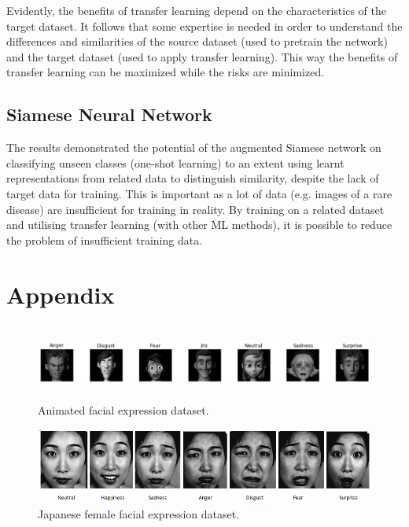 \documentclass{article}
\begin{document}
Evidently, the benefits of transfer learning depend on the characteristics of the target dataset. It follows that some expertise is needed in order to understand the differences and similarities of the source dataset (used to pretrain the network) and the target dataset (used to apply transfer learning). This way the benefits of transfer learning can be maximized while the risks are minimized.

\subsection{Siamese Neural Network}

The results demonstrated the potential of the augmented Siamese network on classifying unseen classes (one-shot learning) to an extent using learnt representations from related data to distinguish similarity, despite the lack of target data for training. This is important as a lot of data (e.g. images of a rare disease) are insufficient for training in reality. By training on a related dataset and utilising transfer learning (with other ML methods), it is possible to reduce the problem of insufficient training data.




\newpage

\appendix

\renewcommand\thefigure{\thesection.\arabic{figure}}    

\section{Appendix}

\setcounter{figure}{0}    

\begin{figure}[H]
    \begin{center}  
      \includegraphics[width=\textwidth,height=2.5cm]{animatedface.png}
      \caption{Animated facial expression dataset.}
      \label{appendix:face-ds}
    \end{center}
\end{figure}

\begin{figure}[H]
    \begin{center}
      \includegraphics[width=\textwidth,height=2.5cm]{jpwomen.jpg}
      \caption{Japanese female facial expression dataset.}
      \label{appendix:jap-ds}
    \end{center}
\end{figure}

\end{document}
